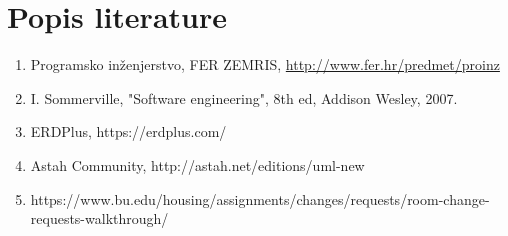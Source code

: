 \chapter*{Popis literature}
	 	
		
		
		\begin{enumerate}
			
			
			\item  Programsko inženjerstvo, FER ZEMRIS, \url{http://www.fer.hr/predmet/proinz}
			
			\item  I. Sommerville, "Software engineering", 8th ed, Addison Wesley, 2007.
			
			\item  ERDPlus, https://erdplus.com/
			
			\item Astah Community, http://astah.net/editions/uml-new
			
			\item  https://www.bu.edu/housing/assignments/changes/requests/room-change-requests-walkthrough/
			
		\end{enumerate}
		
		 